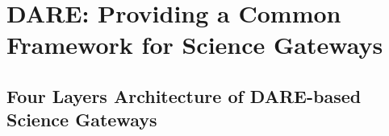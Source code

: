 \documentclass[]{svjour3}
\begin{document}


 

\section{DARE: Providing a Common Framework for Science Gateways}

\subsection{Four Layers Architecture of DARE-based Science Gateways}

\end{document}
